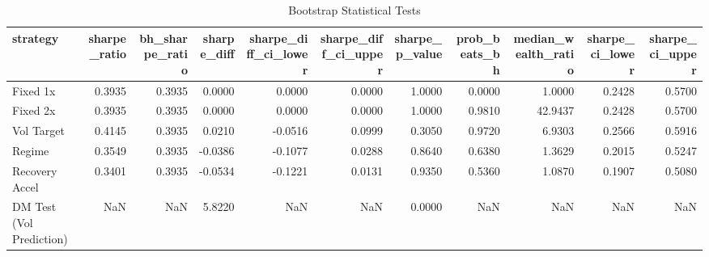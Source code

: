 \begin{table}
\caption{Bootstrap Statistical Tests}
\label{tab:bootstrap}
\begin{tabular}{lrrrrrrrrrr}
\toprule
strategy & sharpe_ratio & bh_sharpe_ratio & sharpe_diff & sharpe_diff_ci_lower & sharpe_diff_ci_upper & sharpe_p_value & prob_beats_bh & median_wealth_ratio & sharpe_ci_lower & sharpe_ci_upper \\
\midrule
Fixed 1x & 0.3935 & 0.3935 & 0.0000 & 0.0000 & 0.0000 & 1.0000 & 0.0000 & 1.0000 & 0.2428 & 0.5700 \\
Fixed 2x & 0.3935 & 0.3935 & 0.0000 & 0.0000 & 0.0000 & 1.0000 & 0.9810 & 42.9437 & 0.2428 & 0.5700 \\
Vol Target & 0.4145 & 0.3935 & 0.0210 & -0.0516 & 0.0999 & 0.3050 & 0.9720 & 6.9303 & 0.2566 & 0.5916 \\
Regime & 0.3549 & 0.3935 & -0.0386 & -0.1077 & 0.0288 & 0.8640 & 0.6380 & 1.3629 & 0.2015 & 0.5247 \\
Recovery Accel & 0.3401 & 0.3935 & -0.0534 & -0.1221 & 0.0131 & 0.9350 & 0.5360 & 1.0870 & 0.1907 & 0.5080 \\
DM Test (Vol Prediction) & NaN & NaN & 5.8220 & NaN & NaN & 0.0000 & NaN & NaN & NaN & NaN \\
\bottomrule
\end{tabular}
\end{table}
